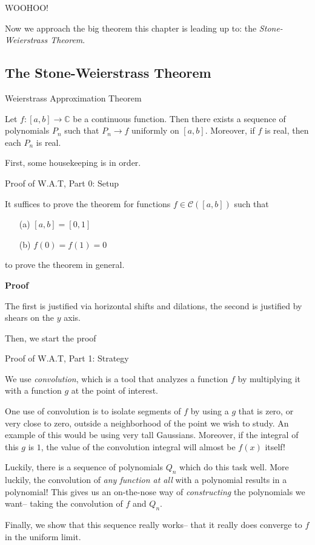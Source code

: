 WOOHOO!

Now we approach the big theorem this chapter is leading up to: the \textit{Stone-Weierstrass Theorem}.

\subsection{The Stone-Weierstrass Theorem}

\begin{theorem} Weierstrass Approximation Theorem

    Let $f: [a, b] \to \mathbb{C}$ be a continuous function. Then there exists a sequence of polynomials $P_n$ such that $P_n \to f$ uniformly on $[a, b]$. Moreover, if $f$ is real, then each $P_n$ is real.
\end{theorem}

First, some housekeeping is in order.

\begin{theorem} Proof of W.A.T, Part 0: Setup

    It suffices to prove the theorem for functions $f \in \mathscr{C}([a, b])$ such that 
    \begin{itemize}
        \item[(a)] $[a, b] = [0,1]$
        \item[(b)] $f(0) = f(1) = 0$
    \end{itemize}
    to prove the theorem in general.

    \textbf{Proof}

     The first is justified via horizontal shifts and dilations, the second is justified by shears on the $y$ axis. 
\end{theorem}

Then, we start the proof

\begin{plan} Proof of W.A.T, Part 1: Strategy

    We use \textit{convolution}, which is a tool that analyzes a function $f$ by multiplying it with a function $g$ at the point of interest. 

    One use of convolution is to isolate segments of $f$ by using a $g$ that is zero, or very close to zero, outside a neighborhood of the point we wish to study. An example of this would be using very tall Gaussians. Moreover, if the integral of this $g$ is $1$, the value of the convolution integral will almost be $f(x)$ itself!

    Luckily, there is a sequence of polynomials $Q_n$ which do this task well. More luckily, the convolution of \textit{any function at all} with a polynomial results in a polynomial! This gives us an on-the-nose way of \textit{constructing} the polynomials we want-- taking the convolution of $f$ and $Q_n$.
    
    Finally, we show that this sequence really works-- that it really does converge to $f$ in the uniform limit.
\end{plan}

